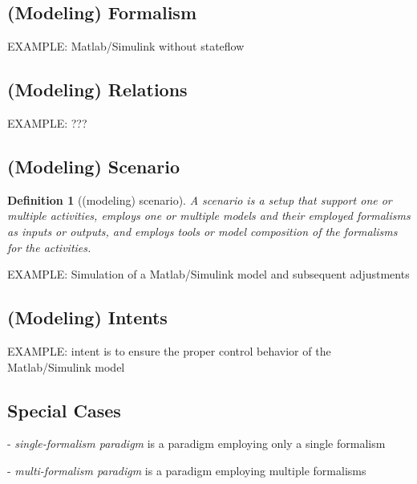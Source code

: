 \documentclass[a4paper,8pt]{article}
\newtheorem{definition}{\bf Definition}
\begin{document}
\subsection{(Modeling) Formalism}

EXAMPLE: Matlab/Simulink without stateflow

\subsection{(Modeling) Relations}

EXAMPLE: ???

\subsection{(Modeling) Scenario}


\begin{definition}[(modeling) scenario]
A \emph{scenario} is a setup that support one or multiple activities, employs one or multiple models and their employed formalisms as inputs or outputs, and employs tools or model composition of the formalisms for the activities. 
\end{definition}




EXAMPLE: Simulation of a Matlab/Simulink model and subsequent adjustments


\subsection{(Modeling) Intents}


EXAMPLE: intent is to ensure the proper control behavior of the Matlab/Simulink model 

\subsection{Special Cases}

- \emph{single-formalism paradigm} is a paradigm employing only a single formalism

- \emph{multi-formalism paradigm} is a paradigm employing multiple formalisms



\end{document}
